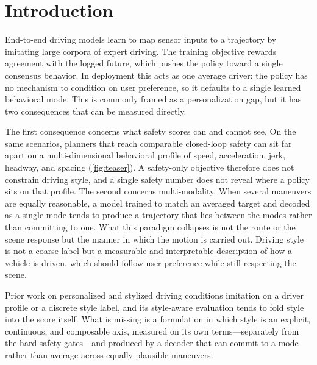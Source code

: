 \section{Introduction}
\label{sec:intro}

End-to-end driving models learn to map sensor inputs to a trajectory by imitating
large corpora of expert driving. The training objective rewards agreement with
the logged future, which pushes the policy toward a single consensus behavior. In
deployment this acts as one average driver: the policy has no mechanism to condition
on user preference, so it defaults to a single learned behavioral mode. This is
commonly framed as a personalization gap, but it has two consequences that can be
measured directly.

The first consequence concerns what safety scores can and cannot see. On the same scenarios,
planners that reach comparable closed-loop safety can sit far apart on a
multi-dimensional behavioral profile of speed, acceleration, jerk, headway, and
spacing (\cref{fig:teaser}). A safety-only objective therefore does not constrain
driving style, and a single safety number does not reveal where a policy sits on
that profile. The second concerns multi-modality. When several maneuvers are
equally reasonable, a model trained to match an averaged target and decoded as a
single mode tends to produce a trajectory that lies between the modes rather than
committing to one. What this paradigm collapses is not the route or the scene
response but the manner in which the motion is carried out. Driving style is not
a coarse label but a measurable and interpretable description of how a vehicle is
driven, which should follow user preference while still respecting the scene.

Prior work on personalized and stylized driving conditions imitation on a driver
profile or a discrete style label,
and its style-aware evaluation tends to fold style into the score itself. What is
missing is a formulation in which style is an explicit, continuous, and composable
axis, measured on its own terms---separately from the hard safety gates---and
produced by a decoder that can commit to a mode rather than average across equally
plausible maneuvers.

